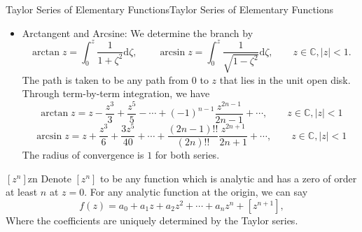 \documentclass[../main.tex]{subfiles}
\begin{document}
\begin{example}{Taylor Series of Elementary Functions}{Taylor Series of Elementary Functions}
\begin{itemize}
	\item Arctangent and Arcsine: We determine the branch by
		\begin{equation*}
			\arctan z = \int_0^z \frac{1}{1+\zeta^2} \mathrm{d} \zeta, \qquad \arcsin z = \int_0^z \frac{1}{\sqrt{1-\zeta^2}} \mathrm{d} \zeta, \qquad z\in \mathbb{C}, \left|z\right|<1.
		\end{equation*}
		The path is taken to be any path from $0$ to $z$ that lies in the unit open disk. Through term-by-term integration, we have
		\begin{equation*}
			\arctan z = z - \frac{z^3}{3} + \frac{z^5}{5} - \cdots + (-1)^{n-1} \frac{z^{2n-1}}{2n-1} + \cdots, \qquad z\in \mathbb{C}, \left|z\right|<1
		\end{equation*}
		\begin{equation*}
			\arcsin z = z + \frac{z^3}{6} + \frac{3z^5}{40} + \cdots + \frac{(2n-1)!!}{(2n)!!} \frac{z^{2n+1}}{2n+1} + \cdots, \qquad z\in \mathbb{C}, \left|z\right|<1
		\end{equation*}
		The radius of convergence is $1$ for both series.
	\end{itemize}
\end{example}

\begin{notation}{$[z^n]$}{zn}
	Denote $[z^n]$ to be any function which is analytic and has a zero of order at least $n$ at $z=0$. For any analytic function at the origin, we can say
	\begin{equation}
		f(z) = a_0 + a_1 z + a_2 z^2 + \cdots + a_n z^n + [z^{n+1}],
	\end{equation}
	Where the coefficients are uniquely determined by the Taylor series.
\end{notation}
\end{document}
